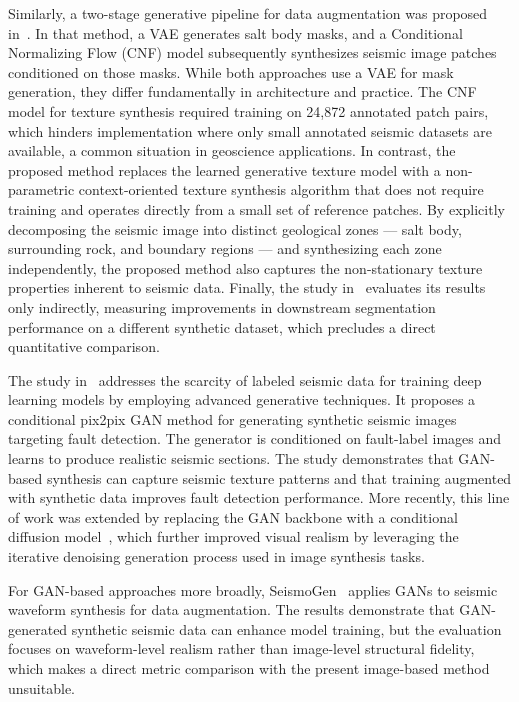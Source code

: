 \documentclass{ieeeaccess}
\begin{document}
Similarly, a two-stage generative pipeline for data augmentation was proposed in~\cite{Henriques2021}. In that method, a VAE generates salt body masks, and a Conditional Normalizing Flow (CNF) model subsequently synthesizes seismic image patches conditioned on those masks. While both approaches use a VAE for mask generation, they differ fundamentally in architecture and practice. The CNF model for texture synthesis required training on 24,872 annotated patch pairs, which hinders implementation where only small annotated seismic datasets are available, a common situation in geoscience applications. In contrast, the proposed method replaces the learned generative texture model with a non-parametric context-oriented texture synthesis algorithm that does not require training and operates directly from a small set of reference patches. By explicitly decomposing the seismic image into distinct geological zones --- salt body, surrounding rock, and boundary regions --- and synthesizing each zone independently, the proposed method also captures the non-stationary texture properties inherent to seismic data. Finally, the study in~\cite{Henriques2021} evaluates its results only indirectly, measuring improvements in downstream segmentation performance on a different synthetic dataset, which precludes a direct quantitative comparison.

The study in~\cite{Choi2021} addresses the scarcity of labeled seismic data for training deep learning models by employing advanced generative techniques. It proposes a conditional pix2pix GAN method for generating synthetic seismic images targeting fault detection. The generator is conditioned on fault-label images and learns to produce realistic seismic sections. The study demonstrates that GAN-based synthesis can capture seismic texture patterns and that training augmented with synthetic data improves fault detection performance. More recently, this line of work was extended by replacing the GAN backbone with a conditional diffusion model~\cite{Choi2025}, which further improved visual realism by leveraging the iterative denoising generation process used in image synthesis tasks.
 
For GAN-based approaches more broadly, SeismoGen~\cite{Wang2021} applies GANs to seismic waveform synthesis for data augmentation. The results demonstrate that GAN-generated synthetic seismic data can enhance model training, but the evaluation focuses on waveform-level realism rather than image-level structural fidelity, which makes a direct metric comparison with the present image-based method unsuitable.
\end{document}
